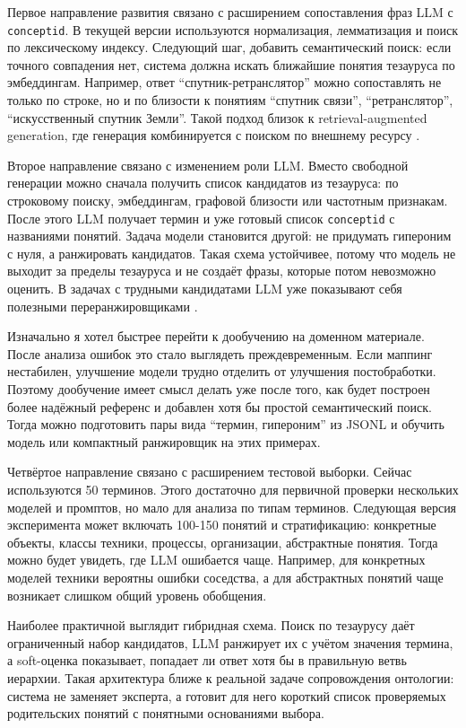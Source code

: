 \documentclass[12pt,a4paper,oneside,openany]{report}
\begin{document}
Первое направление развития связано с расширением сопоставления фраз LLM с \texttt{conceptid}. В текущей версии используются нормализация, лемматизация и поиск по лексическому индексу. Следующий шаг, добавить семантический поиск: если точного совпадения нет, система должна искать ближайшие понятия тезауруса по эмбеддингам. Например, ответ ``спутник-ретранслятор'' можно сопоставлять не только по строке, но и по близости к понятиям ``спутник связи'', ``ретранслятор'', ``искусственный спутник Земли''. Такой подход близок к retrieval-augmented generation, где генерация комбинируется с поиском по внешнему ресурсу \cite{lewis2020rag}.

Второе направление связано с изменением роли LLM. Вместо свободной генерации можно сначала получить список кандидатов из тезауруса: по строковому поиску, эмбеддингам, графовой близости или частотным признакам. После этого LLM получает термин и уже готовый список \texttt{conceptid} с названиями понятий. Задача модели становится другой: не придумать гипероним с нуля, а ранжировать кандидатов. Такая схема устойчивее, потому что модель не выходит за пределы тезауруса и не создаёт фразы, которые потом невозможно оценить. В задачах с трудными кандидатами LLM уже показывают себя полезными переранжировщиками \cite{ma2023reranker}.

Изначально я хотел быстрее перейти к дообучению на доменном материале. После анализа ошибок это стало выглядеть преждевременным. Если маппинг нестабилен, улучшение модели трудно отделить от улучшения постобработки. Поэтому дообучение имеет смысл делать уже после того, как будет построен более надёжный референс и добавлен хотя бы простой семантический поиск. Тогда можно подготовить пары вида ``термин, гипероним'' из JSONL и обучить модель или компактный ранжировщик на этих примерах.

Четвёртое направление связано с расширением тестовой выборки. Сейчас используются 50 терминов. Этого достаточно для первичной проверки нескольких моделей и промптов, но мало для анализа по типам терминов. Следующая версия эксперимента может включать 100-150 понятий и стратификацию: конкретные объекты, классы техники, процессы, организации, абстрактные понятия. Тогда можно будет увидеть, где LLM ошибается чаще. Например, для конкретных моделей техники вероятны ошибки соседства, а для абстрактных понятий чаще возникает слишком общий уровень обобщения.

Наиболее практичной выглядит гибридная схема. Поиск по тезаурусу даёт ограниченный набор кандидатов, LLM ранжирует их с учётом значения термина, а soft-оценка показывает, попадает ли ответ хотя бы в правильную ветвь иерархии. Такая архитектура ближе к реальной задаче сопровождения онтологии: система не заменяет эксперта, а готовит для него короткий список проверяемых родительских понятий с понятными основаниями выбора.
\end{document}

